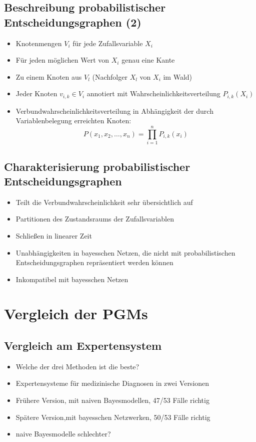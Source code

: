 \documentclass[a5paper,16pt,oneside,landscape]{scrartcl}
\begin{document}
  \subsection*{Beschreibung probabilistischer Entscheidungsgraphen (2)}
  \begin{itemize}
    \item Knotenmengen $V_i$ für jede Zufallsvariable $X_i$
    \item Für jeden möglichen Wert von $X_i$ genau eine Kante
    \item Zu einem Knoten aus $V_l$ (Nachfolger $X_l$ von $X_i$ im Wald)
    \item Jeder Knoten $v_{i,k} \in V_i$ annotiert mit Wahrscheinlichkeitsverteilung $P_{i,k}(X_i)$
    \item Verbundwahrscheinlichkeitsverteilung in Abhängigkeit der durch Variablenbelegung erreichten Knoten: 
\[P(x_1,x_2,\dots,x_n) = \prod_{i=1}^n P_{i,k}(x_i) \]
  \end{itemize}



  \subsection*{Charakterisierung probabilistischer Entscheidungsgraphen}
  \begin{itemize}
    \item Teilt die Verbundwahrscheinlichkeit sehr übersichtlich auf
    \item Partitionen des Zustandsraums der Zufallsvariablen
    \item Schließen in linearer Zeit
    \item Unabhängigkeiten in bayesschen Netzen, die nicht mit probabilistischen Entscheidungsgraphen repräsentiert werden können
    \item Inkompatibel mit bayesschen Netzen
  \end{itemize}



\section{Vergleich der PGMs}


  \subsection*{Vergleich am Expertensystem}
  \begin{itemize}
    \item Welche der drei Methoden ist die beste?
    \item Expertensysteme für medizinische Diagnosen in zwei Versionen
    \item Frühere Version, mit naiven Bayesmodellen, 47/53 Fälle richtig
    \item Spätere Version,mit bayesschen Netzwerken, 50/53 Fälle richtig
    \item naive Bayesmodelle schlechter?
  \end{itemize}
\end{document}
